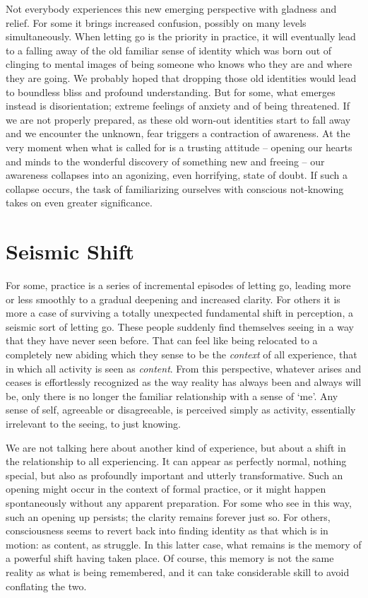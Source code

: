 Not everybody experiences this new emerging perspective with gladness
and relief. For some it brings increased confusion, possibly on many
levels simultaneously. When letting go is the priority in practice, it
will eventually lead to a falling away of the old familiar sense of
identity which was born out of clinging to mental images of being
someone who knows who they are and where they are going. We probably
hoped that dropping those old identities would lead to boundless bliss
and profound understanding. But for some, what emerges instead is
disorientation; extreme feelings of anxiety and of being threatened. If
we are not properly prepared, as these old worn-out identities start to
fall away and we encounter the unknown, fear triggers a contraction of
awareness. At the very moment when what is called for is a trusting
attitude – opening our hearts and minds to the wonderful discovery of
something new and freeing – our awareness collapses into an agonizing,
even horrifying, state of doubt. If such a collapse occurs, the task of
familiarizing ourselves with conscious not-knowing takes on even greater
significance.

\section{Seismic Shift}

For some, practice is a series of incremental episodes of letting go,
leading more or less smoothly to a gradual deepening and increased
clarity. For others it is more a case of surviving a totally unexpected
fundamental shift in perception, a seismic sort of letting go. These
people suddenly find themselves seeing in a way that they have never
seen before. That can feel like being relocated to a completely new
abiding which they sense to be the \emph{context} of all experience, that in
which all activity is seen as \emph{content}. From this perspective, whatever
arises and ceases is effortlessly recognized as the way reality has
always been and always will be, only there is no longer the familiar
relationship with a sense of ‘me’. Any sense of self, agreeable or
disagreeable, is perceived simply as activity, essentially irrelevant to
the seeing, to just knowing.

We are not talking here about another kind of experience, but about a
shift in the relationship to all experiencing. It can appear as
perfectly normal, nothing special, but also as profoundly important and
utterly transformative. Such an opening might occur in the context of
formal practice, or it might happen spontaneously without any apparent
preparation. For some who see in this way, such an opening up persists;
the clarity remains forever just so. For others, consciousness seems to
revert back into finding identity as that which is in motion: as
content, as struggle. In this latter case, what remains is the memory of
a powerful shift having taken place. Of course, this memory is not the
same reality as what is being remembered, and it can take considerable
skill to avoid conflating the two.

